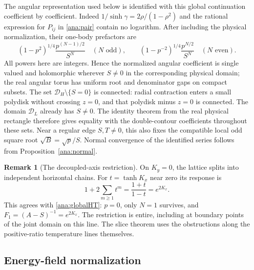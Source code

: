 \documentclass[11pt]{article}
\numberwithin{equation}{section}
\theoremstyle{definition}
\newtheorem{remark}[theorem]{Remark}
\renewcommand{\DH}{\mathcal D_H}
\newcommand{\DL}{\mathcal D_L}
\begin{document}
The angular representation used below is identified with this global
continuation coefficient by coefficient. Indeed
\(1/\sinh\gamma=2\rho/(1-\rho^2)\) and the rational expression
for \(P_{ij}\) in \eqref{ana:pair} contain no logarithm. After
including the physical normalization, their one-body prefactors are
\[
 (1-p^2)^{1/4}\frac{p^{(N-1)/2}}{S^N}
 \quad(N\text{ odd}),\qquad
 (1-p^{-2})^{1/4}\frac{p^{N/2}}{S^N}
 \quad(N\text{ even}).
\]
All powers here are integers. Hence the normalized angular coefficient
is single valued and holomorphic wherever \(S\ne0\) in the
corresponding physical domain; the real angular torus has uniform
root and denominator gaps on compact subsets. The set
\(\DH\setminus\{S=0\}\) is connected: radial contraction enters
a small polydisk without crossing \(z=0\), and that polydisk minus
\(z=0\) is connected. The domain \(\DL\) already has \(S\ne0\).
The identity theorem from the real physical rectangle therefore gives
equality with the double-contour coefficients throughout these sets.
Near a regular edge \(S,T\ne0\), this also fixes the compatible
local odd square root \(\sqrt B=\sqrt p/S\). Normal convergence
of the identified series follows from Proposition~\ref{ana:normal}.

\begin{remark}[The decoupled-axis restriction]\label{ana:axis}
On \(K_y=0\), the lattice splits into independent horizontal chains.
For \(t=\tanh K_x\) near zero its response is
\[
 1+2\sum_{m\ge1}t^m=\frac{1+t}{1-t}=e^{2K_x}.
\]
This agrees with \eqref{ana:globalHT}: \(p=0\), only \(N=1\)
survives, and \(F_1=(A-S)^{-1}=e^{2K_x}\).
The restriction is entire, including at boundary points of the
joint domain on this line. The slice theorem uses the obstructions
along the positive-ratio temperature lines themselves.
\end{remark}

\subsection{Energy-field normalization}
\end{document}
